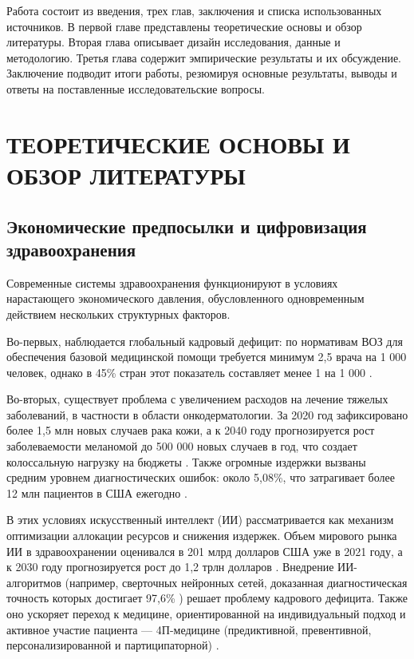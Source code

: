 \documentclass[12pt, a4paper]{article}
\begin{document}
Работа состоит из введения, трех глав, заключения и списка использованных источников. В первой главе представлены теоретические основы и обзор литературы. Вторая глава описывает дизайн исследования, данные и методологию. Третья глава содержит эмпирические результаты и их обсуждение. Заключение подводит итоги работы, резюмируя основные результаты, выводы и ответы на поставленные исследовательские вопросы.

\newpage

\section{ТЕОРЕТИЧЕСКИЕ ОСНОВЫ И ОБЗОР ЛИТЕРАТУРЫ}

\subsection{Экономические предпосылки и цифровизация здравоохранения}
Современные системы здравоохранения функционируют в условиях нарастающего экономического давления, обусловленного одновременным действием нескольких структурных факторов.

Во-первых, наблюдается глобальный кадровый дефицит: по нормативам ВОЗ для обеспечения базовой медицинской помощи требуется минимум 2,5 врача на 1 000 человек, однако в 45\% стран этот показатель составляет менее 1 на 1 000 \cite{Liu2021}.

Во-вторых, существует проблема с увеличением расходов на лечение тяжелых заболеваний, в частности в области онкодерматологии. За 2020 год зафиксировано более 1,5 млн новых случаев рака кожи, а к 2040 году прогнозируется рост заболеваемости меланомой до 500 000 новых случаев в год, что создает колоссальную нагрузку на бюджеты \cite{Jagemann2024}. Также огромные издержки вызваны средним уровнем диагностических ошибок: около 5,08\%, что затрагивает более 12 млн пациентов в США ежегодно \cite{Liu2021}.

В этих условиях искусственный интеллект (ИИ) рассматривается как механизм оптимизации аллокации ресурсов и снижения издержек. Объем мирового рынка ИИ в здравоохранении оценивался в 201 млрд долларов США уже в 2021 году, а к 2030 году прогнозируется рост до 1,2 трлн долларов \cite{Lamotkin2024}. Внедрение ИИ-алгоритмов (например, сверточных нейронных сетей, доказанная диагностическая точность которых достигает 97,6\% \cite{Traini2025}) решает проблему кадрового дефицита. Также оно ускоряет переход к медицине, ориентированной на индивидуальный подход и активное участие пациента — 4П-медицине (предиктивной, превентивной, персонализированной и партиципаторной) \cite{Myzrova2024}.
\end{document}
